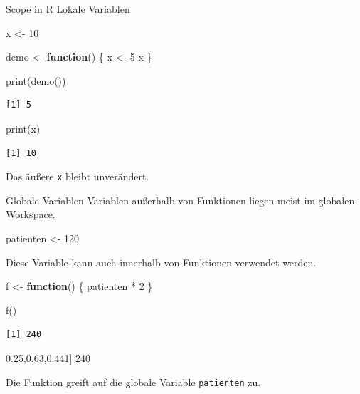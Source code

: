 \documentclass[
  10pt,
  ignorenonframetext,
  aspectratio=169,
]{beamer}
\newenvironment{Shaded}{}{}
\newcommand{\ControlFlowTok}[1]{\textcolor[rgb]{0.00,0.44,0.13}{\textbf{#1}}}
\newcommand{\DecValTok}[1]{\textcolor[rgb]{0.25,0.63,0.44}{#1}}
\newcommand{\FunctionTok}[1]{\textcolor[rgb]{0.02,0.16,0.49}{#1}}
\newcommand{\NormalTok}[1]{#1}
\newcommand{\OtherTok}[1]{\textcolor[rgb]{0.00,0.44,0.13}{#1}}
\newcommand{\SpecialCharTok}[1]{\textcolor[rgb]{0.25,0.44,0.63}{#1}}
\begin{document}
\begin{frame}[fragile]{Scope in R}
\label{scope-in-r}
Lokale Variablen

\begin{Shaded}
\begin{Highlighting}[]
\NormalTok{x }\OtherTok{\textless{}{-}} \DecValTok{10}

\NormalTok{demo }\OtherTok{\textless{}{-}} \ControlFlowTok{function}\NormalTok{() \{}
\NormalTok{  x }\OtherTok{\textless{}{-}} \DecValTok{5}
\NormalTok{  x}
\NormalTok{\}}

\FunctionTok{print}\NormalTok{(}\FunctionTok{demo}\NormalTok{())}
\end{Highlighting}
\end{Shaded}

\begin{verbatim}
[1] 5
\end{verbatim}

\begin{Shaded}
\begin{Highlighting}[]
\FunctionTok{print}\NormalTok{(x)}
\end{Highlighting}
\end{Shaded}

\begin{verbatim}
[1] 10
\end{verbatim}

Das äußere \texttt{x} bleibt unverändert.
\end{frame}

\begin{frame}[fragile]{Globale Variablen}
\label{globale-variablen}
Variablen außerhalb von Funktionen liegen meist im globalen Workspace.

\begin{Shaded}
\begin{Highlighting}[]
\NormalTok{patienten }\OtherTok{\textless{}{-}} \DecValTok{120}
\end{Highlighting}
\end{Shaded}

Diese Variable kann auch innerhalb von Funktionen verwendet werden.

\begin{Shaded}
\begin{Highlighting}[]
\NormalTok{f }\OtherTok{\textless{}{-}} \ControlFlowTok{function}\NormalTok{() \{}
\NormalTok{  patienten }\SpecialCharTok{*} \DecValTok{2}
\NormalTok{\}}

\FunctionTok{f}\NormalTok{()}
\end{Highlighting}
\end{Shaded}

\begin{verbatim}
[1] 240
\end{verbatim}

\begin{Shaded}
\begin{Highlighting}[]
\NormalTok{[}\DecValTok{1}\NormalTok{] }\DecValTok{240}
\end{Highlighting}
\end{Shaded}

Die Funktion greift auf die globale Variable \texttt{patienten} zu.
\end{frame}
\end{document}
